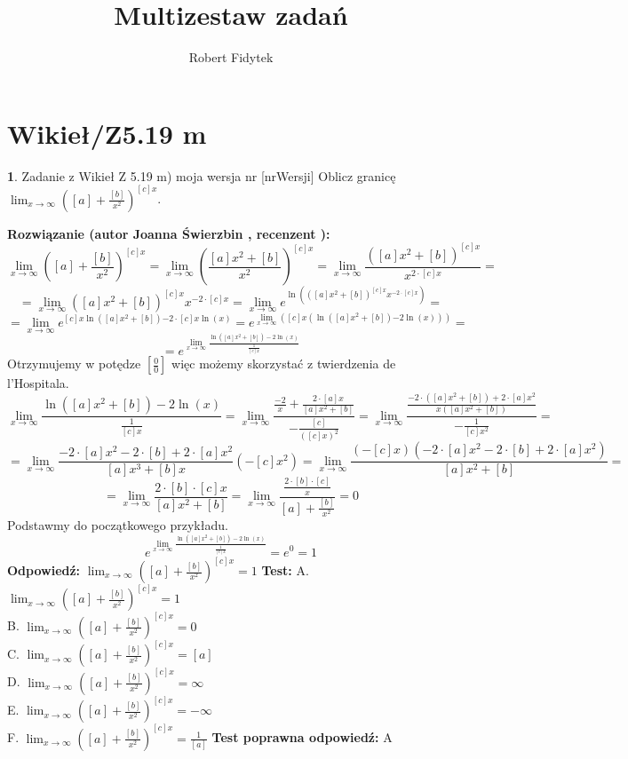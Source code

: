 \documentclass[12pt, a4paper]{article}
\title{Multizestaw zadań}
\author{Robert Fidytek}
\date{}
\theoremstyle{definition} %
\newtheorem{zad}{}
\newcommand{\kategoria}[1]{\section{#1}} %
\newcommand{\zadStart}[1]{\begin{zad}#1\newline} %
\newcommand{\zadStop}{\end{zad}}   %
\newcommand{\rozwStart}[2]{\noindent \textbf{Rozwiązanie (autor #1 , recenzent #2): }\newline} %
\newcommand{\rozwStop}{\newline}                                            %
\newcommand{\odpStart}{\noindent \textbf{Odpowiedź:}\newline}    %
\newcommand{\odpStop}{\newline}                                             %
\newcommand{\testStart}{\noindent \textbf{Test:}\newline} %
\newcommand{\testStop}{\newline} %
\newcommand{\kluczStart}{\noindent \textbf{Test poprawna odpowiedź:}\newline} %
\newcommand{\kluczStop}{\newline} %
\begin{document}
\maketitle


\kategoria{Wikieł/Z5.19 m}
\zadStart{Zadanie z Wikieł Z 5.19 m) moja wersja nr [nrWersji]}
Oblicz granicę $\lim_{x \rightarrow \infty} \left( [a]+\frac{[b]}{x^2}\right)^{[c]x}$.
\zadStop
\rozwStart{Joanna Świerzbin}{}
$$\lim_{x \rightarrow \infty} \left( [a]+\frac{[b]}{x^2}\right)^{[c]x} = \lim_{x \rightarrow \infty} \left(\frac{[a]x^2+[b]}{x^2}\right)^{[c]x} 
= \lim_{x \rightarrow \infty} \frac{([a]x^2+[b])^{[c]x}}{x^{2\cdot[c]x}} = $$
$$ = \lim_{x \rightarrow \infty} {([a]x^2+[b])^{[c]x}}{x^{-2\cdot[c]x}} = \lim_{x \rightarrow \infty} e^{\ln({([a]x^2+[b])^{[c]x}}{x^{-2\cdot[c]x}})} = $$
$$= \lim_{x \rightarrow \infty} e^{{[c]x}\ln([a]x^2+[b]){-2\cdot[c]x}\ln({x})} =  e^{\lim_{x \rightarrow \infty}({[c]x}(\ln([a]x^2+[b]){-2}\ln({x})))} =$$
$$ =  e^{\lim_{x \rightarrow \infty} \frac{\ln([a]x^2+[b])-2\ln({x})}{\frac{1}{[c]x}} } $$
Otrzymujemy w potędze $ \left[ \frac{0}{0} \right] $ więc możemy skorzystać z twierdzenia de l'Hospitala.
$${\lim_{x\rightarrow \infty}\frac{\ln([a]x^2+[b])-2\ln({x})}{\frac{1}{[c]x}}} = \lim_{x \rightarrow \infty} \frac{\frac{-2}{x}+\frac{2\cdot[a]x}{[a]x^2+[b]}}{-\frac{[c]}{([c]x)^2}} = \lim_{x \rightarrow \infty} \frac{\frac{-2\cdot([a]x^2+[b])+2\cdot[a]x^2}{x([a]x^2+[b])}}{-\frac{1}{[c]x^2}}=$$
$$= \lim_{x \rightarrow \infty} \frac{-2\cdot[a]x^2-2\cdot[b]+2\cdot[a]x^2}{[a]x^3+[b]x} \left(-[c]x^2 \right)= \lim_{x \rightarrow \infty} \frac{(-[c]x)(-2\cdot[a]x^2-2\cdot[b]+2\cdot[a]x^2)}{[a]x^2+[b]}=$$
$$= \lim_{x \rightarrow \infty} \frac{2\cdot[b]\cdot[c]x}{[a]x^2+[b]}= \lim_{x \rightarrow \infty} \frac{\frac{2\cdot[b]\cdot[c]}{x}}{[a]+\frac{[b]}{x^2}} =0$$
Podstawmy do początkowego przykładu.
$$e^{\lim_{x \rightarrow \infty} \frac{\ln([a]x^2+[b])-2\ln({x})}{\frac{1}{[c]x}}} = e^0 = 1$$
\rozwStop
\odpStart
$\lim_{x \rightarrow \infty} \left( [a]+\frac{[b]}{x^2}\right)^{[c]x}=1 $
\odpStop
\testStart
A. $\lim_{x \rightarrow \infty} \left( [a]+\frac{[b]}{x^2}\right)^{[c]x}=1 $\\
B. $\lim_{x \rightarrow \infty} \left( [a]+\frac{[b]}{x^2}\right)^{[c]x}=0 $\\
C. $\lim_{x \rightarrow \infty} \left( [a]+\frac{[b]}{x^2}\right)^{[c]x}=[a] $\\
D. $\lim_{x \rightarrow \infty} \left( [a]+\frac{[b]}{x^2}\right)^{[c]x}=\infty $\\
E. $\lim_{x \rightarrow \infty} \left( [a]+\frac{[b]}{x^2}\right)^{[c]x}=-\infty $\\
F. $\lim_{x \rightarrow \infty} \left( [a]+\frac{[b]}{x^2}\right)^{[c]x}=\frac{1}{[a]} $
\testStop
\kluczStart
A
\kluczStop
\end{document}
